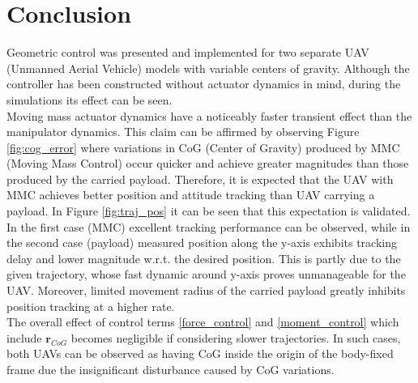 \section{Conclusion} \label{sec:conclusion}
Geometric control was presented and implemented for two separate UAV (Unmanned Aerial Vehicle) models with variable centers of gravity. Although the controller has been constructed without actuator dynamics in mind, during the simulations its effect can be seen. \\
Moving mass actuator dynamics have a noticeably faster transient effect than the manipulator dynamics. This claim can be affirmed by observing Figure \ref{fig:cog_error} where variations in CoG (Center of Gravity) produced by MMC (Moving Mass Control) occur quicker and achieve greater magnitudes than those produced by the carried payload. Therefore, it is expected that the UAV with MMC achieves better position and attitude tracking than UAV carrying a payload. In Figure \ref{fig:traj_pos} it can be seen that this expectation is validated. \\
In the first case (MMC) excellent tracking performance can be observed, while in the second case (payload) measured position along the y-axis exhibits tracking delay and lower magnitude w.r.t. the desired position. This is partly due to the given trajectory, whose fast dynamic around y-axis proves unmanageable for the UAV. Moreover, limited movement radius of the carried payload greatly inhibits position tracking at a higher rate. \\   
The overall effect of control terms \eqref{force_control} and \eqref{moment_control} which include $\textbf{r}_{CoG}$ becomes negligible if considering slower trajectories. In such cases, both UAVs can be observed as having CoG inside the origin of the body-fixed frame due the insignificant disturbance caused by CoG variations. 
